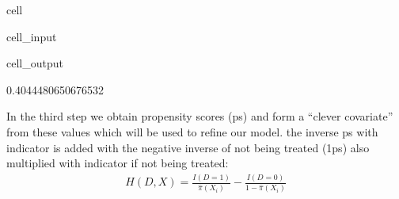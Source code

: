 \documentclass[letterpaper,10pt,english]{jupyterBook}
\begin{document}
\begin{sphinxuseclass}{cell}
\begin{sphinxVerbatimInput}
\begin{sphinxuseclass}{cell_input}
\begin{sphinxVerbatim}[commandchars=\\\{\}]
\PYG{p}{[}\PYG{p}{]}  \PYG{p}{[}\PYG{p}{]}
\end{sphinxVerbatim}

\end{sphinxuseclass}\end{sphinxVerbatimInput}
\begin{sphinxVerbatimOutput}

\begin{sphinxuseclass}{cell_output}
\begin{sphinxVerbatim}[commandchars=\\\{\}]
0.4044480650676532
\end{sphinxVerbatim}

\end{sphinxuseclass}\end{sphinxVerbatimOutput}

\end{sphinxuseclass}
\sphinxAtStartPar
In the third step we obtain propensity scores (ps) and form a “clever covariate” from these values which will be used to refine our model. the inverse ps with indicator is added with the negative inverse of not being treated (1\sphinxhyphen{}ps) also multiplied with indicator if not being treated:
\begin{equation*}
\begin{split}H(D,X) = \frac{I(D=1)}{\hat \pi (X_i)} - \frac{I(D=0)}{1 - \hat \pi (X_i)}\end{split}
\end{equation*}
\end{document}
